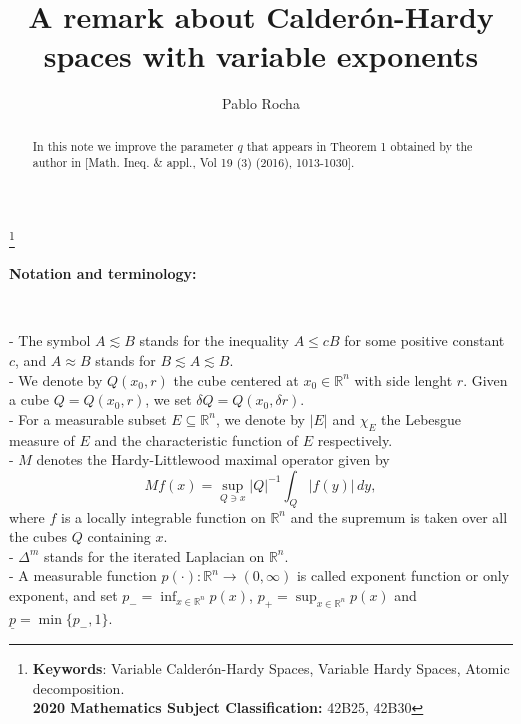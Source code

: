 \documentclass[oneside,10pt]{article}
\newcommand\blfootnote[1]{%
  \begingroup
  \renewcommand\thefootnote{}\footnote{#1}%
  \addtocounter{footnote}{-1}%
  \endgroup}
\begin{document}
\title{A remark about Calder\'on-Hardy spaces with variable exponents}
\author{Pablo Rocha}


\maketitle


\begin{abstract}
In this note we improve the parameter $q$ that appears in Theorem 1 obtained by the author in [Math. Ineq. \& appl., Vol 19 (3) (2016), 
1013-1030].
\end{abstract}

\blfootnote{{\bf Keywords}: Variable Calder\'on-Hardy Spaces, Variable Hardy Spaces, Atomic decomposition. \\
{\bf 2020 Mathematics Subject Classification:} 42B25, 42B30}

\textbf{Notation and terminology:}

\

- The symbol $A\lesssim B$ stands for the inequality $A \leq cB$ for some positive constant $c$, and $A \approx B$ stands for 
$B \lesssim A \lesssim B$. \\

- We denote by $Q\left( x_0,r\right)$ the cube centered at $x_0 \in \mathbb{R}^{n}$ with side lenght $r$. Given a cube 
$Q = Q(x_0,r )$, we set $\delta Q = Q(x_0, \delta r)$. \\

- For a measurable subset $E\subseteq \mathbb{R}^{n}$, we denote by $\left\vert E\right\vert$ and $\chi_{E}$ the Lebesgue measure of $E$ and the characteristic function of $E$ respectively. \\

- $M$ denotes the Hardy-Littlewood maximal operator given by
\[
Mf(x) = \sup_{Q \ni x} |Q|^{- 1}\int_{Q} |f(y)| \, dy,
\]
where $f$ is a locally integrable function on $\mathbb{R}^{n}$ and the supremum is taken over all the cubes $Q$ containing $x$. \\

- $\Delta^m$ stands for the iterated Laplacian on $\mathbb{R}^n$. \\

- A measurable function $p(\cdot) : \mathbb{R}^n \to (0, \infty)$ is called exponent function or only exponent, and set 
$p_{-}= \inf_{x \in \mathbb{R}^{n}} p(x)$, $p_{+} = \sup_{x \in \mathbb{R}^{n}} p(x)$ and $\underline{p} = \min \{ p_{-}, 1 \}$. \\
\end{document}
